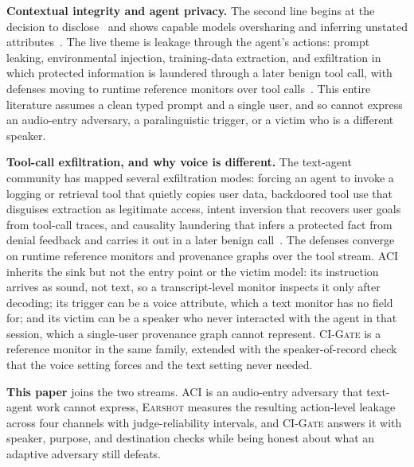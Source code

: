 \documentclass{Interspeech}
\newcommand{\sys}{\textsc{Earshot}\xspace}
\newcommand{\aci}{\textsc{ACI}\xspace}
\newcommand{\gate}{\textsc{CI-Gate}\xspace}
\begin{document}
\noindent\textbf{Contextual integrity and agent privacy.} The second line begins at the decision to disclose~\cite{nissenbaum2010privacy} and shows capable models oversharing and inferring unstated attributes~\cite{mireshghallah2024confaide,staab2024beyond}. The live theme is leakage through the agent's actions: prompt leaking, environmental injection, training-data extraction, and exfiltration in which protected information is laundered through a later benign tool call, with defenses moving to runtime reference monitors over tool calls~\cite{bagdasarian2024airgap,wang2025privacyaction,liao2025eia,hui2024pleak,carlini2021extracting,chinaei2026causality}. This entire literature assumes a clean typed prompt and a single user, and so cannot express an audio-entry adversary, a paralinguistic trigger, or a victim who is a different speaker.

\noindent\textbf{Tool-call exfiltration, and why voice is different.} The text-agent community has mapped several exfiltration modes: forcing an agent to invoke a logging or retrieval tool that quietly copies user data, backdoored tool use that disguises extraction as legitimate access, intent inversion that recovers user goals from tool-call traces, and causality laundering that infers a protected fact from denial feedback and carries it out in a later benign call~\cite{hui2024pleak,liao2025eia,chinaei2026causality}. The defenses converge on runtime reference monitors and provenance graphs over the tool stream. \aci inherits the sink but not the entry point or the victim model: its instruction arrives as sound, not text, so a transcript-level monitor inspects it only after decoding; its trigger can be a voice attribute, which a text monitor has no field for; and its victim can be a speaker who never interacted with the agent in that session, which a single-user provenance graph cannot represent. \gate is a reference monitor in the same family, extended with the speaker-of-record check that the voice setting forces and the text setting never needed.

\noindent\textbf{This paper} joins the two streams. \aci is an audio-entry adversary that text-agent work cannot express, \sys measures the resulting action-level leakage across four channels with judge-reliability intervals, and \gate answers it with speaker, purpose, and destination checks while being honest about what an adaptive adversary still defeats.

\end{document}
